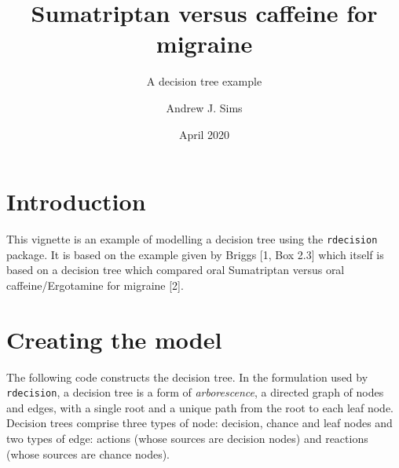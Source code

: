 \documentclass[
]{article}
\title{Sumatriptan versus caffeine for migraine}
\subtitle{A decision tree example}
\author{Andrew J. Sims}
\date{April 2020}
\begin{document}
\maketitle

\hypertarget{introduction}{%
\section{Introduction}\label{introduction}}

This vignette is an example of modelling a decision tree using the
\texttt{rdecision} package. It is based on the example given by Briggs
{[}1, Box 2.3{]} which itself is based on a decision tree which compared
oral Sumatriptan versus oral caffeine/Ergotamine for migraine {[}2{]}.

\hypertarget{creating-the-model}{%
\section{Creating the model}\label{creating-the-model}}

The following code constructs the decision tree. In the formulation used
by \texttt{rdecision}, a decision tree is a form of \emph{arborescence},
a directed graph of nodes and edges, with a single root and a unique
path from the root to each leaf node. Decision trees comprise three
types of node: decision, chance and leaf nodes and two types of edge:
actions (whose sources are decision nodes) and reactions (whose sources
are chance nodes).
\end{document}
